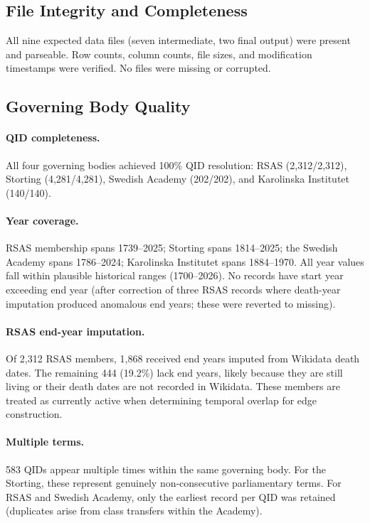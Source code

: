 \subsection{File Integrity and Completeness}

All nine expected data files (seven intermediate, two final output) were
present and parseable. Row counts, column counts, file sizes, and
modification timestamps were verified. No files were missing or corrupted.

\subsection{Governing Body Quality}

\paragraph{QID completeness.} All four governing bodies achieved 100\% QID
resolution: RSAS (2{,}312/2{,}312), Storting (4{,}281/4{,}281), Swedish
Academy (202/202), and Karolinska Institutet (140/140).

\paragraph{Year coverage.} RSAS membership spans 1739--2025; Storting spans
1814--2025; the Swedish Academy spans 1786--2024; Karolinska Institutet
spans 1884--1970. All year values fall within plausible historical ranges
(1700--2026). No records have start year exceeding end year (after
correction of three RSAS records where death-year imputation produced
anomalous end years; these were reverted to missing).

\paragraph{RSAS end-year imputation.} Of 2{,}312 RSAS members, 1{,}868
received end years imputed from Wikidata death dates. The remaining 444
(19.2\%) lack end years, likely because they are still living or their
death dates are not recorded in Wikidata. These members are treated as
currently active when determining temporal overlap for edge construction.

\paragraph{Multiple terms.} 583 QIDs appear multiple times within the same
governing body. For the Storting, these represent genuinely non-consecutive
parliamentary terms. For RSAS and Swedish Academy, only the earliest record
per QID was retained (duplicates arise from class transfers within the
Academy).


